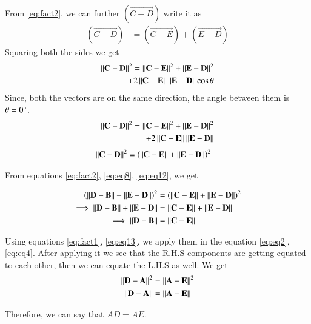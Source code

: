 \documentclass[journal,12pt,twocolumn]{IEEEtran}
\begin{document}
	From \eqref{eq:fact2}, we can further $(\vec{C-D})$ write it as
	\begin{align}\label{eq:eq9}
		(\vec{C-D}) &= (\vec{C-E}) + (\vec{E-D})
	\end{align}
	Squaring both the sides we get
	\begin{align} \label{eq:eq10}
		\left\lVert\mathbf{C}-\mathbf{D}\right\rVert^{2} = \left\lVert\mathbf{C}-\mathbf{E}\right\rVert^{2} + \left\lVert\mathbf{E}-\mathbf{D}\right\rVert^{2} \nonumber \\ + 2\left\lVert\mathbf{C}-\mathbf{E}\right\rVert\left\lVert\mathbf{E}-\mathbf{D}\right\rVert\cos\theta
	\end{align}
	Since, both the vectors are on the same direction, the angle between them is $\theta = 0\degree$.
	\begin{align} \label{eq:eq11}
		\left\lVert\mathbf{C}-\mathbf{D}\right\rVert^{2} = \left\lVert\mathbf{C}-\mathbf{E}\right\rVert^{2} + \left\lVert\mathbf{E}-\mathbf{D}\right\rVert^{2} \nonumber \\ + 2\left\lVert\mathbf{C}-\mathbf{E}\right\rVert\left\lVert\mathbf{E}-\mathbf{D}\right\rVert
	\end{align}
	\begin{align}\label{eq:eq12}
		\left\lVert\mathbf{C}-\mathbf{D}\right\rVert^{2} &= \left(\left\lVert\mathbf{C}-\mathbf{E}\right\rVert + \left\lVert\mathbf{E}-\mathbf{D}\right\rVert\right)^{2}
	\end{align}

	From equations \eqref{eq:fact2}, \eqref{eq:eq8}, \eqref{eq:eq12}, we get
	
	\begin{align}\label{eq:eq13}
		\left(\left\lVert\mathbf{D}-\mathbf{B}\right\rVert + \left\lVert\mathbf{E}-\mathbf{D}\right\rVert\right)^{2} &= \left(\left\lVert\mathbf{C}-\mathbf{E}\right\rVert + \left\lVert\mathbf{E}-\mathbf{D}\right\rVert\right)^{2} \nonumber \\
		\implies \left\lVert\mathbf{D}-\mathbf{B}\right\rVert + \left\lVert\mathbf{E}-\mathbf{D}\right\rVert &= \left\lVert\mathbf{C}-\mathbf{E}\right\rVert + \left\lVert\mathbf{E}-\mathbf{D}\right\rVert \nonumber \\
		\implies \left\lVert\mathbf{D}-\mathbf{B}\right\rVert &= \left\lVert\mathbf{C}-\mathbf{E}\right\rVert
	\end{align}

	Using equations \eqref{eq:fact1}, \eqref{eq:eq13}, we apply them in the equation \eqref{eq:eq2}, \eqref{eq:eq4}. After applying it we see that the R.H.S components are getting equated to each other, then we can equate the L.H.S as well. We get 
	\begin{align}\label{eq:eq15}
		\left\lVert\mathbf{D}-\mathbf{A}\right\rVert^{2} &= \left\lVert\mathbf{A}-\mathbf{E}\right\rVert^{2} \nonumber \\
		\left\lVert\mathbf{D}-\mathbf{A}\right\rVert &= \left\lVert\mathbf{A}-\mathbf{E}\right\rVert
	\end{align}
	
	Therefore, we can say that $AD = AE$.
	
\end{document}
